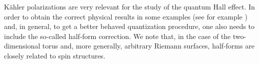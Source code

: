\documentclass[a4paper,11pt]{article}
\newtheorem{definition}{Definition}
\newtheorem{proposition}{Proposition}
\begin{document}

{}

K\"ahler polarizations are very relevant for the study of the quantum Hall effect.
In order to obtain the correct physical results in some examples (see for example \cite{BrianHall}) and, in general, to get a better behaved quantization procedure, one also needs to include the so-called half-form correction. 
We note that, in the case of the two-dimensional torus and, more generally, arbitrary Riemann surfaces, half-forms are closely related to spin structures.
\end{document}
